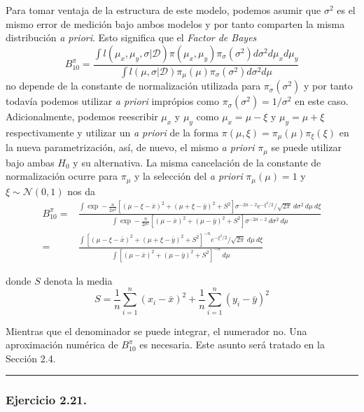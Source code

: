 \documentclass[12pt,]{article}
\begin{document}
Para tomar ventaja de la estructura de este modelo, podemos asumir que
\(\sigma^2\) es el mismo error de medición bajo ambos modelos y por
tanto comparten la misma distribución \emph{a priori}. Esto significa
que el \emph{Factor de Bayes} \[
B_{10}^\pi=\frac{\int l(\mu_x,\mu_y,\sigma|\mathcal{D})\pi(\mu_x,\mu_y)\pi_\sigma(\sigma^2)d\sigma^2d\mu_x d\mu_y}{\int l(\mu,\sigma|\mathcal{D})\pi_\mu(\mu)\pi_\sigma(\sigma^2)d\sigma^2d\mu}
\] no depende de la constante de normalización utilizada para
\(\pi_\sigma(\sigma^2)\) y por tanto todavía podemos utilizar \emph{a
priori} imprópios como \(\pi_\sigma(\sigma^2)=1/\sigma^2\) en este caso.
Adicionalmente, podemos reescribir \(\mu_x\) y \(\mu_y\) como
\(\mu_x=\mu-\xi\) y \(\mu_y=\mu+\xi\) respectivamente y utilizar un
\emph{a priori} de la forma \(\pi(\mu,\xi)=\pi_\mu(\mu)\pi_\xi(\xi)\) en
la nueva parametrización, así, de nuevo, el mismo \emph{a priori}
\(\pi_\mu\) se puede utilizar bajo ambas \(H_0\) y su alternativa. La
misma cancelación de la constante de normalización ocurre para
\(\pi_\mu\) y la selección del \emph{a priori} \(\pi_\mu(\mu)=1\) y
\(\xi\sim\mathcal{N}(0,1)\) nos da \[
\begin{array}{rl}
B_{10}^\pi=&\frac{\displaystyle \int\exp-\frac{n}{2\sigma^2}[(\mu-\xi-\bar{x})^2+(\mu+\xi-\bar{y})^2+S^2]\sigma^{-2n-2}e^{-\xi^2/2}/\sqrt{2\pi}\ d\sigma^2\ d\mu \ d\xi}
{\displaystyle \int\exp-\frac{n}{2\sigma^2}[(\mu-\bar{x})^2+(\mu-\bar{y})^2+S^2]\sigma^{-2n-2}\ d\sigma^2\ d\mu}\\
=&\frac{\displaystyle \int[(\mu-\xi-\bar{x})^2+(\mu+\xi-\bar{y})^2+S^2]^{-n}e^{-\xi^2/2}/\sqrt{2\pi}\ d\mu \ d\xi}
{\displaystyle \int[(\mu-\bar{x})^2+(\mu-\bar{y})^2+S^2]^{-n}\ d\mu}
\end{array}
\]

donde \(S\) denota la media \[
S=\frac{1}{n}\sum_{i=1}^{n}(x_i-\bar{x})^2+\frac{1}{n}\sum_{i=1}^{n}(y_i-\bar{y})^2
\]

Mientras que el denominador se puede integrar, el numerador no. Una
aproximación numérica de \(B_{10}^\pi\) es necesaria. Este asunto será
tratado en la Sección 2.4.

\begin{center}\rule{0.5\linewidth}{\linethickness}\end{center}

\subsubsection{Ejercicio 2.21.}\label{ejercicio-2.21.}
\end{document}

